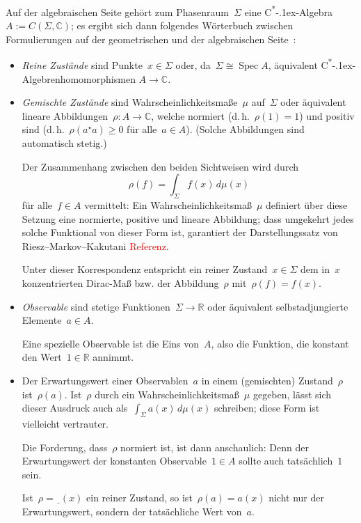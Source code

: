 \documentclass[a4paper,ngerman,12pt]{scrartcl}
\theoremstyle{definition}
\theoremstyle{plain}
\theoremstyle{remark}
\newcommand{\RR}{\mathbb{R}}
\newcommand{\CC}{\mathbb{C}}
\newcommand{\freist}{\underline{\ \ }}
\newcommand{\csalgebra}{C\textsuperscript{*}\kern-.1ex-Algebra}
\newcommand{\csalgebren}{C\textsuperscript{*}\kern-.1ex-Alge\-bren}
\DeclareMathOperator{\Spec}{Spec}
\renewcommand{\_}{\mathpunct{.}\,}
\newcommand{\?}{\,{:}\,}
\newcommand{\XXX}[1]{\textcolor{red}{#1}}
\begin{document}
Auf der algebraischen Seite gehört zum Phasenraum~$\Sigma$ eine \csalgebra~$A
:= C(\Sigma, \CC)$; es ergibt sich dann folgendes Wörterbuch zwischen
Formulierungen auf der geometrischen und der algebraischen
Seite~\cite{nlab:classmech}:

\begin{itemize}
\item \emph{Reine Zustände} sind Punkte~$x \in \Sigma$ oder, da~$\Sigma \cong \Spec
A$, äquivalent \csalgebren{}\-ho\-mo\-mor\-phis\-men $A \to \CC$.

\item \emph{Gemischte Zustände} sind Wahrscheinlichkeitsmaße~$\mu$ auf~$\Sigma$ oder
äquivalent lineare Abbildungen~$\rho : A \to \CC$, welche normiert
(d.\,h.~$\rho(1) = 1$) und positiv sind (d.\,h.~$\rho(a^\star a) \geq 0$
für alle~$a \in A$). (Solche Abbildungen sind automatisch stetig.)

Der Zusammenhang zwischen den beiden Sichtweisen wird durch
\[ \rho(f) = \int_\Sigma f(x) \,d\mu(x) \]
für alle~$f \in A$ vermittelt: Ein Wahrscheinlichkeitsmaß~$\mu$ definiert über
diese Setzung eine normierte, positive und lineare Abbildung; dass umgekehrt
jedes solche Funktional von dieser Form ist, garantiert der Darstellungssatz
von Riesz--Markov--Kakutani \XXX{Referenz}.

Unter dieser Korrespondenz entspricht ein reiner Zustand~$x \in \Sigma$ dem
in~$x$ konzentrierten Dirac-Maß bzw. der Abbildung~$\rho$ mit~$\rho(f) =
f(x)$.

\item \emph{Observable} sind stetige Funktionen~$\Sigma \to \RR$ oder
äquivalent selbstadjungierte Elemente~$a \in A$.

Eine spezielle Observable ist die Eins von~$A$, also die Funktion, die konstant
den Wert~$1 \in \RR$ annimmt.

\item Der Erwartungswert einer Observablen~$a$ in einem (gemischten) Zustand~$\rho$
ist~$\rho(a)$. Ist~$\rho$ durch ein Wahrscheinlichkeitsmaß~$\mu$ gegeben,
lässt sich dieser Ausdruck auch als~$\int_\Sigma a(x) \,d\mu(x)$ schreiben;
diese Form ist vielleicht vertrauter.

Die Forderung, dass~$\rho$ normiert ist, ist dann anschaulich: Denn der
Erwartungswert der konstanten Observable~$1 \in A$ sollte auch tatsächlich~$1$
sein.

Ist~$\rho = \freist(x)$ ein reiner Zustand, so ist~$\rho(a) = a(x)$ nicht nur
der Erwartungswert, sondern der tatsächliche Wert von~$a$.
\end{itemize}
\end{document}
